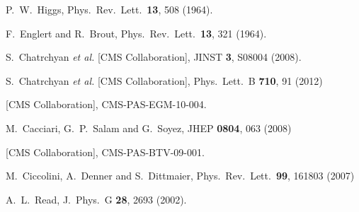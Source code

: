 \documentclass{PoS}
\begin{document}
\begin{thebibliography}{99}
  P.~W.~Higgs,
  Phys.\ Rev.\ Lett.\  {\bf 13}, 508 (1964).

  F.~Englert and R.~Brout,
  Phys.\ Rev.\ Lett.\  {\bf 13}, 321 (1964).

  S.~Chatrchyan {\it et al.}  [CMS Collaboration],
  JINST {\bf 3}, S08004 (2008).

  S.~Chatrchyan {\it et al.}  [CMS Collaboration],
  Phys.\ Lett.\ B {\bf 710}, 91 (2012)

  [CMS Collaboration],
  CMS-PAS-EGM-10-004.

  M.~Cacciari, G.~P.~Salam and G.~Soyez,
  JHEP {\bf 0804}, 063 (2008)

  [CMS Collaboration],
  CMS-PAS-BTV-09-001.

  M.~Ciccolini, A.~Denner and S.~Dittmaier,
  Phys.\ Rev.\ Lett.\  {\bf 99}, 161803 (2007)

  A.~L.~Read,
  J.\ Phys.\ G {\bf 28}, 2693 (2002).


\end{thebibliography}
\end{document}
